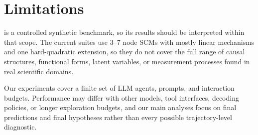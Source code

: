 \section{Limitations}

\projectname{} is a controlled synthetic benchmark, so its results should be
interpreted within that scope. The current suites use 3--7 node SCMs with
mostly linear mechanisms and one hard-quadratic extension, so they do not cover
the full range of causal structures, functional forms, latent variables, or
measurement processes found in real scientific domains.

Our experiments cover a finite set of LLM agents, prompts, and interaction
budgets. Performance may differ with other models, tool interfaces, decoding
policies, or longer exploration budgets, and our main analyses focus on final
predictions and final hypotheses rather than every possible trajectory-level
diagnostic.

